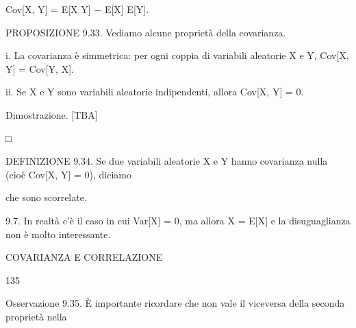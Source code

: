 \documentclass[a4paper,portrait,12pt]{article}
\begin{document}
\begin{flushleft}
Cov[X, Y] = E[X Y] $-$ E[X] E[Y].
\end{flushleft}


\begin{flushleft}
PROPOSIZIONE 9.33. Vediamo alcune propriet\`{a} della covarianza.
\end{flushleft}


\begin{flushleft}
i. La covarianza \`{e} simmetrica: per ogni coppia di variabili aleatorie X e Y, Cov[X, Y] = Cov[Y, X].
\end{flushleft}


\begin{flushleft}
ii. Se X e Y sono variabili aleatorie indipendenti, allora Cov[X, Y] = 0.
\end{flushleft}


\begin{flushleft}
Dimostrazione. [TBA]
\end{flushleft}





□





\begin{flushleft}
DEFINIZIONE 9.34. Se due variabili aleatorie X e Y hanno covarianza nulla (cio\`{e} Cov[X, Y] = 0), diciamo
\end{flushleft}


\begin{flushleft}
che sono scorrelate.
\end{flushleft}


\begin{flushleft}
9.7. In realt\`{a} c'\`{e} il caso in cui Var[X] = 0, ma allora X = E[X] e la disuguaglianza non \`{e} molto interessante.
\end{flushleft}





\begin{flushleft}
 COVARIANZA E CORRELAZIONE
\end{flushleft}





135





\begin{flushleft}
Osservazione 9.35. \`{E} importante ricordare che non vale il viceversa della seconda propriet\`{a} nella
\end{flushleft}
\end{document}
